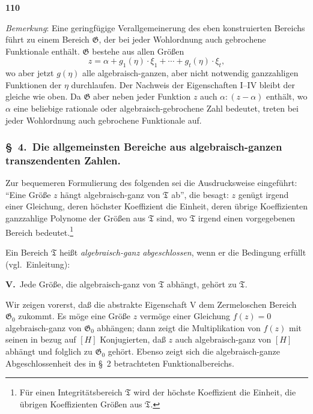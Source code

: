 \documentclass[12pt,a4paper]{article}
\begin{document}
\newpage
\begin{center}
\textbf{110}
\end{center}

\emph{Bemerkung}: Eine geringf\"ugige Verallgemeinerung des eben konstruierten Bereichs f\"uhrt zu einem Bereich $\mathfrak{G}$, der bei jeder Wohlordnung auch gebrochene Funktionale enth\"alt. $\mathfrak{G}$ bestehe aus allen Gr\"o\ss en
\[z = \alpha + g_1(\eta) \cdot \xi_1 + \cdots + g_t(\eta) \cdot \xi_t,\]
wo aber jetzt $g(\eta)$ alle algebraisch-ganzen, aber nicht notwendig ganzzahligen Funktionen der $\eta$ durchlaufen. Der Nachweis der Eigenschaften I--IV bleibt der gleiche wie oben. Da $\mathfrak{G}$ aber neben jeder Funktion $z$ auch $\alpha : (z - \alpha)$ enth\"alt, wo $\alpha$ eine beliebige rationale oder algebraisch-gebrochene Zahl bedeutet, treten bei jeder Wohlordnung auch gebrochene Funktionale auf.

\subsubsection*{\S\ 4.\ Die allgemeinsten Bereiche aus algebraisch-ganzen transzendenten Zahlen.}

Zur bequemeren Formulierung des folgenden sei die Ausdrucksweise eingef\"uhrt: ``Eine Gr\"o\ss e $z$ h\"angt algebraisch-ganz von $\mathfrak{T}$ ab'', die besagt: $z$ gen\"ugt irgend einer Gleichung, deren h\"ochster Koeffizient die Einheit, deren \"ubrige Koeffizienten ganzzahlige Polynome der Gr\"o\ss en aus $\mathfrak{T}$ sind, wo $\mathfrak{T}$ irgend einen vorgegebenen Bereich bedeutet.\footnote{F\"ur einen Integrit\"atsbereich $\mathfrak{T}$ wird der h\"ochste Koeffizient die Einheit, die \"ubrigen Koeffizienten Gr\"o\ss en aus $\mathfrak{T}$.}

Ein Bereich $\mathfrak{T}$ hei\ss t \emph{algebraisch-ganz abgeschlossen}, wenn er die Bedingung erf\"ullt (vgl.\ Einleitung):

\smallskip
\textbf{V.}\ Jede Gr\"o\ss e, die algebraisch-ganz von $\mathfrak{T}$ abh\"angt, geh\"ort zu $\mathfrak{T}$.

\smallskip
Wir zeigen vorerst, da\ss{} die abstrakte Eigenschaft V dem Zermeloschen Bereich $\mathfrak{G}_0$ zukommt. Es m\"oge eine Gr\"o\ss e $z$ verm\"oge einer Gleichung $f(z) = 0$ algebraisch-ganz von $\mathfrak{G}_0$ abh\"angen; dann zeigt die Multiplikation von $f(z)$ mit seinen in bezug auf $[H]$ Konjugierten, da\ss{} $z$ auch algebraisch-ganz von $[H]$ abh\"angt und folglich zu $\mathfrak{G}_0$ geh\"ort. Ebenso zeigt sich die algebraisch-ganze Abgeschlossenheit des in \S\ 2 betrachteten Funktionalbereichs.
\end{document}
